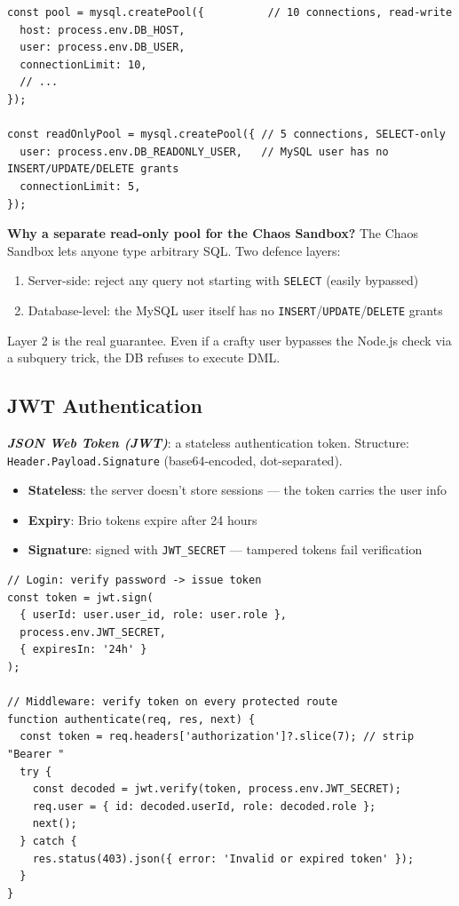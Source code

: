\documentclass[11pt,a4paper]{article}
\newcommand{\term}[1]{\textbf{\textit{#1}}}
\newcommand{\T}[1]{\texttt{#1}}          %
\begin{document}
\begin{lstlisting}[style=js]
const pool = mysql.createPool({          // 10 connections, read-write
  host: process.env.DB_HOST,
  user: process.env.DB_USER,
  connectionLimit: 10,
  // ...
});

const readOnlyPool = mysql.createPool({ // 5 connections, SELECT-only
  user: process.env.DB_READONLY_USER,   // MySQL user has no INSERT/UPDATE/DELETE grants
  connectionLimit: 5,
});
\end{lstlisting}

\begin{whybox}
\textbf{Why a separate read-only pool for the Chaos Sandbox?}
The Chaos Sandbox lets anyone type arbitrary SQL. Two defence layers:
\begin{enumerate}[nosep, leftmargin=1.5em]
  \item Server-side: reject any query not starting with \T{SELECT} (easily bypassed)
  \item Database-level: the MySQL user itself has no \T{INSERT}/\T{UPDATE}/\T{DELETE} grants
\end{enumerate}
Layer 2 is the real guarantee. Even if a crafty user bypasses the Node.js check via
a subquery trick, the DB refuses to execute DML.
\end{whybox}

\subsection{JWT Authentication}

\begin{defbox}
\term{JSON Web Token (JWT)}: a stateless authentication token. Structure:
\texttt{Header.Payload.Signature} (base64-encoded, dot-separated).
\begin{itemize}[nosep, leftmargin=1.5em]
  \item \textbf{Stateless}: the server doesn't store sessions — the token carries the user info
  \item \textbf{Expiry}: Brio tokens expire after 24 hours
  \item \textbf{Signature}: signed with \T{JWT\_SECRET} — tampered tokens fail verification
\end{itemize}
\end{defbox}

\begin{lstlisting}[style=js]
// Login: verify password -> issue token
const token = jwt.sign(
  { userId: user.user_id, role: user.role },
  process.env.JWT_SECRET,
  { expiresIn: '24h' }
);

// Middleware: verify token on every protected route
function authenticate(req, res, next) {
  const token = req.headers['authorization']?.slice(7); // strip "Bearer "
  try {
    const decoded = jwt.verify(token, process.env.JWT_SECRET);
    req.user = { id: decoded.userId, role: decoded.role };
    next();
  } catch {
    res.status(403).json({ error: 'Invalid or expired token' });
  }
}
\end{lstlisting}
\end{document}
